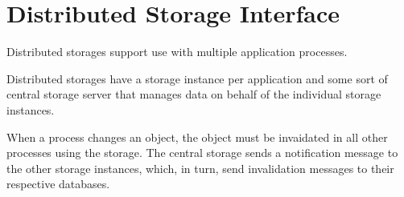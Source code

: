 \documentclass{howto}
\begin{document}
\section{Distributed Storage Interface}

Distributed storages support use with multiple application processes.

Distributed storages have a storage instance per application and some
sort of central storage server that manages data on behalf of the
individual storage instances.

When a process changes an object, the object must be invaidated in all
other processes using the storage.  The central storage sends a
notification message to the other storage instances, which, in turn,
send invalidation messages to their respective databases.
\end{document}
